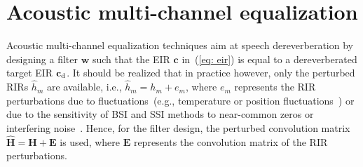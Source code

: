 \documentclass[twocolumn]{bmcart}%
\begin{document}
\section{Acoustic multi-channel equalization}
\label{sec: ame}
Acoustic multi-channel equalization techniques aim at speech dereverberation by designing a filter $\mathbf{w}$ such that the EIR $\mathbf{c}$ in~(\ref{eq: eir}) is equal to a dereverberated target EIR $\mathbf{c}_{\rm d}$.
It should be realized that in practice however, only the perturbed RIRs $\hat{h}_m$ are available, i.e., $\hat{h}_m = h_m + e_m$, where $e_m$ represents the RIR perturbations due to fluctuations~(e.g., temperature or position fluctuations~\cite{Radlovic_ITSA_2000}) or due to the sensitivity of BSI and SSI methods to near-common zeros or interfering noise~\cite{Khong_ICASSP_2008,Haque_SPL_2008,Hu_EUSIPCO_2015}.
Hence, for the filter design, the perturbed convolution matrix $\hat{\mathbf{H}} = \mathbf{H} + \mathbf{E}$ is used, where $\mathbf{E}$ represents the convolution matrix of the RIR perturbations.
\end{document}
